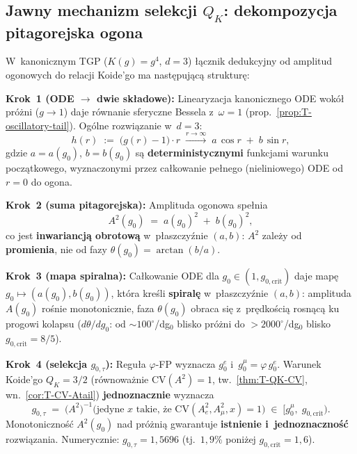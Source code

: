 \subsection{Jawny mechanizm selekcji $Q_K$: dekompozycja pitagorejska ogona}%
\label{app:T-pythagorean-selection}

\begin{proposition}[Pitagorejski mechanizm selekcji $Q_K = 3/2$]%
\label{prop:T-pythagorean-selection}
W~kanonicznym TGP ($K(g)=g^4$, $d=3$) \l{}\k{a}cznik dedukcyjny
od amplitud ogonowych do relacji Koide'go ma nast\k{e}puj\k{a}c\k{a}
struktur\k{e}:

\medskip\noindent
\textbf{Krok~1 (ODE $\to$ dwie sk\l{}adowe):}
Linearyzacja kanonicznego ODE wok\'o\l{} pr\'o\.zni ($g \to 1$)
daje r\'ownanie sferyczne Bessela z~$\omega = 1$
(prop.~\ref{prop:T-oscillatory-tail}).
Og\'olne rozwi\k{a}zanie w~$d=3$:
\begin{equation}\label{eq:T-tail-ab}
  h(r) \;:=\; \bigl(g(r)-1\bigr)\cdot r
  \;\xrightarrow{r\to\infty}\;
  a\,\cos r \;+\; b\,\sin r,
\end{equation}
gdzie $a = a(g_0)$, $b = b(g_0)$ s\k{a} \textbf{deterministycznymi}
funkcjami warunku pocz\k{a}tkowego, wyznaczonymi przez ca\l{}kowanie
pe\l{}nego (nieliniowego) ODE od $r = 0$ do ogona.

\medskip\noindent
\textbf{Krok~2 (suma pitagorejska):}
Amplituda ogonowa spe\l{}nia
\begin{equation}\label{eq:T-A2-pythagoras}
  A^2(g_0) \;=\; a(g_0)^2 \;+\; b(g_0)^2,
\end{equation}
co jest \textbf{inwariancj\k{a} obrotow\k{a}} w~p\l{}aszczy\'znie
$(a,b)$: $A^2$ zale\.zy od \textbf{promienia},
nie od fazy $\theta(g_0) = \arctan(b/a)$.

\medskip\noindent
\textbf{Krok~3 (mapa spiralna):}
Ca\l{}kowanie ODE dla $g_0 \in (1, g_{0,\mathrm{crit}})$
daje map\k{e} $g_0 \mapsto (a(g_0), b(g_0))$,
kt\'ora kre\'sli \textbf{spiral\k{e}} w~p\l{}aszczy\'znie $(a,b)$:
amplituda $A(g_0)$ ro\'snie monotonicznie,
faza $\theta(g_0)$ obraca si\k{e} z~pr\k{e}dko\'sci\k{a}
rosn\k{a}c\k{a} ku progowi kolapsu
($d\theta/dg_0$: od $\sim\!100^\circ$/dg$_0$ blisko pr\'o\.zni
do $>2000^\circ$/dg$_0$ blisko $g_{0,\mathrm{crit}} = 8/5$).

\medskip\noindent
\textbf{Krok~4 (selekcja $g_{0,\tau}$):}
Regu\l{}a $\varphi$-FP wyznacza $g_0^e$ i~$g_0^\mu = \varphi\,g_0^e$.
Warunek Koide'go $Q_K = 3/2$ (r\'ownowa\.znie
$\mathrm{CV}(A^2) = 1$, tw.~\ref{thm:T-QK-CV},
wn.~\ref{cor:T-CV-Atail}) \textbf{jednoznacznie} wyznacza
\begin{equation}\label{eq:T-g0tau-selection}
  g_{0,\tau} \;=\; \bigl(A^2\bigr)^{-1}\!\!
  \bigl(\text{jedyne $x$ takie, \.ze }
  \mathrm{CV}(A_e^2, A_\mu^2, x) = 1\bigr)
  \;\in\; \bigl[g_0^\mu,\; g_{0,\mathrm{crit}}\bigr).
\end{equation}
Monotoniczno\'s\'c $A^2(g_0)$ nad pr\'o\.zni\k{a}
gwarantuje \textbf{istnienie i~jednoznaczno\'s\'c} rozwi\k{a}zania.
Numerycznie: $g_{0,\tau} = 1{,}5696$ (tj.\ $1{,}9\%$ poni\.zej
$g_{0,\mathrm{crit}} = 1{,}6$).


\end{proposition}
